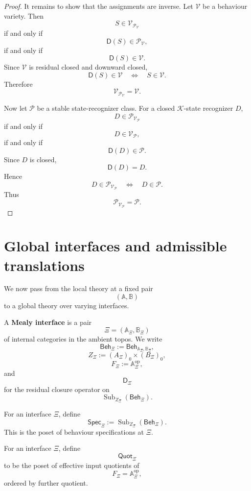 \begin{proof}
It remains to show that the assignments are inverse. Let \(\mathcal V\) be a
behaviour variety. Then
\[
S\in\mathcal V_{\mathcal P_{\mathcal V}}
\]
if and only if
\[
\mathsf D(S)\in\mathcal P_{\mathcal V},
\]
if and only if
\[
\mathsf D(S)\in\mathcal V.
\]
Since \(\mathcal V\) is residual closed and downward closed,
\[
\mathsf D(S)\in\mathcal V
\quad\Longleftrightarrow\quad
S\in\mathcal V.
\]
Therefore
\[
\mathcal V_{\mathcal P_{\mathcal V}}=\mathcal V.
\]

Now let \(\mathcal P\) be a stable state-recognizer class. For a closed
\(\mathcal K\)-state recognizer \(D\),
\[
D\in\mathcal P_{\mathcal V_{\mathcal P}}
\]
if and only if
\[
D\in\mathcal V_{\mathcal P},
\]
if and only if
\[
\mathsf D(D)\in\mathcal P.
\]
Since \(D\) is closed,
\[
\mathsf D(D)=D.
\]
Hence
\[
D\in\mathcal P_{\mathcal V_{\mathcal P}}
\quad\Longleftrightarrow\quad
D\in\mathcal P.
\]
Thus
\[
\mathcal P_{\mathcal V_{\mathcal P}}=\mathcal P.
\]
\end{proof}

\section{Global interfaces and admissible translations}
\label{sec:eilenberg-global-interfaces-admissible-translations}

We now pass from the local theory at a fixed pair
\[
(\mathbb A,\mathbb B)
\]
to a global theory over varying interfaces.

\begin{definition}
\label{def:eilenberg-mealy-interface}
A \textbf{Mealy interface} is a pair
\[
\Xi=(\mathbb A_\Xi,\mathbb B_\Xi)
\]
of internal categories in the ambient topos. We write
\[
\mathsf{Beh}_\Xi
:=
\mathsf{Beh}_{\mathbb A_\Xi,\mathbb B_\Xi},
\]
\[
Z_\Xi:=
(A_\Xi)_0\times(B_\Xi)_0,
\]
\[
F_\Xi:=
\mathbb A_\Xi^{\mathrm{op}},
\]
and
\[
\mathsf D_\Xi
\]
for the residual closure operator on
\[
\operatorname{Sub}_{Z_\Xi}(\mathsf{Beh}_\Xi).
\]
\end{definition}

\begin{definition}
\label{def:eilenberg-specification-poset-interface}
For an interface \(\Xi\), define
\[
\mathsf{Spec}_\Xi
:=
\operatorname{Sub}_{Z_\Xi}(\mathsf{Beh}_\Xi).
\]
This is the poset of behaviour specifications at \(\Xi\).
\end{definition}

\begin{definition}
\label{def:eilenberg-effective-quotient-poset-interface}
For an interface \(\Xi\), define
\[
\mathsf{Quot}_\Xi
\]
to be the poset of effective input quotients of
\[
F_\Xi=\mathbb A_\Xi^{\mathrm{op}},
\]
ordered by further quotient.
\end{definition}


